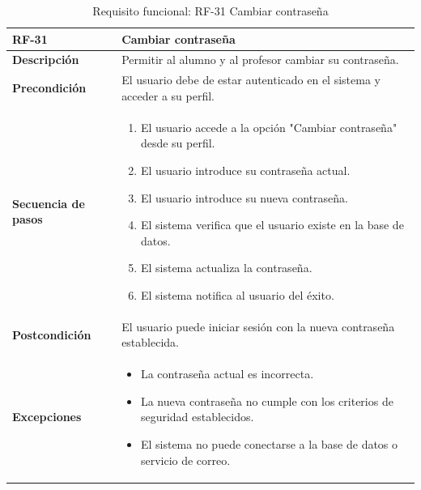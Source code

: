 \begin{table}[H]
\centering
\begin{tabularx}{\textwidth}{
  |>{\centering\arraybackslash}l
  |>{\centering\arraybackslash}X|}
\hline
\textbf{RF-31} & \textbf{Cambiar contraseña} \\ \hline

\textbf{Descripción} & Permitir al alumno y al profesor cambiar su contraseña. \\ \hline

\textbf{Precondición} & El usuario debe de estar autenticado en el sistema y acceder a su perfil. \\ \hline

\textbf{Secuencia de pasos} & 
\begin{enumerate}
  \item El usuario accede a la opción "Cambiar contraseña" desde su perfil.
  \item El usuario introduce su contraseña actual.
  \item El usuario introduce su nueva contraseña.
  \item El sistema verifica que el usuario existe en la base de datos.
  \item El sistema actualiza la contraseña.
  \item El sistema notifica al usuario del éxito.
\end{enumerate} \\ \hline

\textbf{Postcondición} & El usuario puede iniciar sesión con la nueva contraseña establecida. \\ \hline

\textbf{Excepciones} & 
\begin{itemize}
  \item La contraseña actual es incorrecta.
  \item La nueva contraseña no cumple con los criterios de seguridad establecidos.
  \item El sistema no puede conectarse a la base de datos o servicio de correo.
\end{itemize} \\ \hline
\end{tabularx}
\caption{Requisito funcional: RF-31 Cambiar contraseña}
\label{tab:RF-31}
\end{table}
